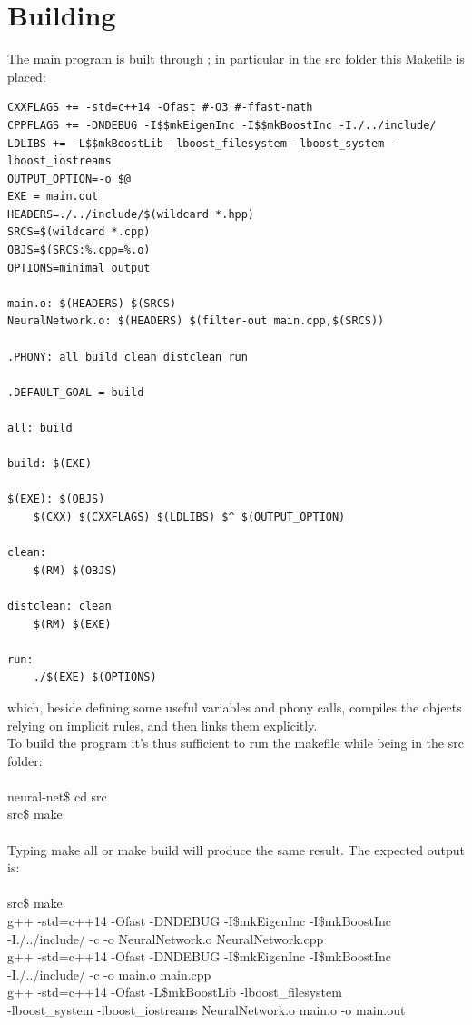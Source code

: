 \documentclass[12pt, a4paper]{report}
\theoremstyle{definition}
\begin{document}
\section{Building}
The main program is built through \cite{make}; in particular in the src folder this Makefile is placed:
\begin{lstlisting}[frame=single]
CXXFLAGS += -std=c++14 -Ofast #-O3 #-ffast-math
CPPFLAGS += -DNDEBUG -I$$mkEigenInc -I$$mkBoostInc -I./../include/
LDLIBS += -L$$mkBoostLib -lboost_filesystem -lboost_system -lboost_iostreams
OUTPUT_OPTION=-o $@
EXE = main.out
HEADERS=./../include/$(wildcard *.hpp)
SRCS=$(wildcard *.cpp)
OBJS=$(SRCS:%.cpp=%.o)
OPTIONS=minimal_output

main.o: $(HEADERS) $(SRCS)
NeuralNetwork.o: $(HEADERS) $(filter-out main.cpp,$(SRCS))

.PHONY: all build clean distclean run

.DEFAULT_GOAL = build

all: build

build: $(EXE)

$(EXE): $(OBJS)
	$(CXX) $(CXXFLAGS) $(LDLIBS) $^ $(OUTPUT_OPTION)

clean:
	$(RM) $(OBJS)

distclean: clean
	$(RM) $(EXE)

run:
	./$(EXE) $(OPTIONS)
\end{lstlisting}
which, beside defining some useful variables and phony calls, compiles the objects relying on implicit rules, and then links them explicitly.\\
To build the program it's thus sufficient to run the makefile while being in the src folder:\\
{\\ \ttfamily 
	neural-net\$ cd src\\
	src\$ make\\
	\\}
Typing {\ttfamily make all} or {\ttfamily make build} will produce the same result. The expected output is:\\
{\\ \ttfamily 
 src\$ make \\
g++ -std=c++14 -Ofast -DNDEBUG -I\$mkEigenInc -I\$mkBoostInc\\ -I./../include/  -c -o NeuralNetwork.o NeuralNetwork.cpp\\
g++ -std=c++14 -Ofast -DNDEBUG -I\$mkEigenInc -I\$mkBoostInc\\ -I./../include/  -c -o main.o main.cpp\\
g++ -std=c++14 -Ofast -L\$mkBoostLib -lboost\_filesystem\\ -lboost\_system -lboost\_iostreams NeuralNetwork.o main.o -o main.out\\
	\\}
\end{document}
